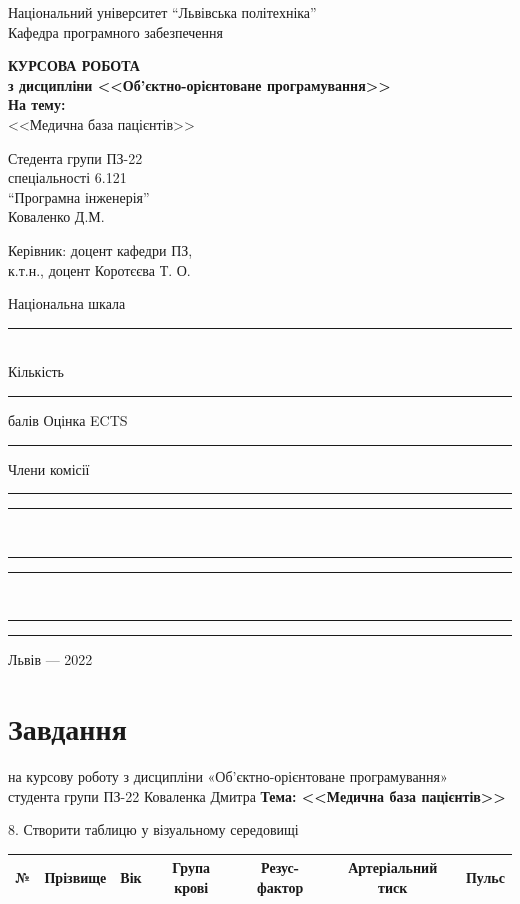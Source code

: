 \documentclass[oneside,14pt]{extarticle}
\begin{document}
\begin{titlepage}
	\begin{center}
		Національний університет “Львівська політехніка”\\
		Кафедра програмного забезпечення
		
		\vspace{170pt}
		\textbf{КУРСОВА РОБОТА}\\
		\textbf{з дисципліни <<Об’єктно-орієнтоване програмування>>}\\
		\textbf{На тему:}\\
		<<Медична база пацієнтів>>
		\vspace*{40pt}
		
		\begin{flushright}
			Стедента групи ПЗ-22\\
			спеціальності 6.121\\
			“Програмна інженерія”\\
			Коваленко Д.М.
			\bigbreak
			
			Керівник: доцент кафедри ПЗ,\\
			к.т.н., доцент Коротєєва Т. О.
			\bigbreak
			
			Національна шкала \rule{4cm}{0.15mm}\\			
			Кількість \rule{1cm}{0.15mm} балів  Оцінка ECTS \rule{1cm}{0.15mm}
			\bigbreak
			
			Члени комісії \rule{1cm}{0.15mm} \rule{4cm}{0.15mm}\\
			\rule{1cm}{0.15mm} \rule{4cm}{0.15mm}\\
			\rule{1cm}{0.15mm} \rule{4cm}{0.15mm}
		\end{flushright}
		\vspace{\fill}
		Львів — 2022
	\end{center}
\end{titlepage}
\setcounter{page}{2}
\tableofcontents
\newpage
\section*{Завдання}
\begin{center}
	на курсову роботу з дисципліни «Об’єктно-орієнтоване програмування»\\
	студента групи ПЗ-22 Коваленка Дмитра
	\bigbreak
	\textbf{Тема: <<Медична база пацієнтів>>}
\end{center}
8. Створити таблицю у візуальному середовищі

\begin{tabular}{|c|c|c|c|c|c|c|}
	\hline
	№ & Прізвище & Вік & Група крові & Резус-фактор & Артеріальний тиск & Пульс\\
	\hline
\end{tabular}
\end{document}
